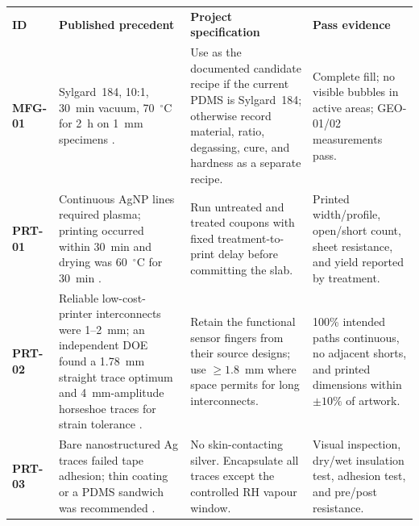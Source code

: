 \vspace{0.3em}
\begingroup
\fontsize{8.0}{9.35}\selectfont
\setlength{\tabcolsep}{3pt}\renewcommand{\arraystretch}{1.07}
\begin{tabularx}{\linewidth}{>{\raggedright\arraybackslash\bfseries\color{AUBRed}}p{1.2cm}Y Y Y}
\color{white}\textbf{ID} & \color{white}\textbf{Published precedent} &
\color{white}\textbf{Project specification} & \color{white}\textbf{Pass evidence} \\
MFG-01 & Sylgard~184, 10:1, 30~min vacuum, 70~$^{\circ}$C for 2~h on 1~mm
specimens \cite{q4abukhalaf2018}. & Use as the documented candidate recipe if
the current PDMS is Sylgard~184; otherwise record material, ratio, degassing,
cure, and hardness as a separate recipe. & Complete fill; no visible bubbles in
active areas; GEO-01/02 measurements pass. \\
PRT-01 & Continuous AgNP lines required plasma; printing occurred within
30~min and drying was 60~$^{\circ}$C for 30~min
\cite{albrecht2018stretch}. & Run untreated and treated coupons with fixed
treatment-to-print delay before committing the slab. & Printed width/profile,
open/short count, sheet resistance, and yield reported by treatment. \\
PRT-02 & Reliable low-cost-printer interconnects were 1--2~mm; an independent
DOE found a 1.78~mm straight trace optimum and 4~mm-amplitude horseshoe traces
for strain tolerance \cite{albrecht2018stretch,q4abukhalaf2019}. & Retain the
functional sensor fingers from their source designs; use $\geq1.8$~mm where
space permits for long interconnects. & 100\% intended paths continuous, no
adjacent shorts, and printed dimensions within $\pm10\%$ of artwork. \\
PRT-03 & Bare nanostructured Ag traces failed tape adhesion; thin coating or a
PDMS sandwich was recommended \cite{albrecht2018stretch}. & No skin-contacting
silver. Encapsulate all traces except the controlled RH vapour window. & Visual
inspection, dry/wet insulation test, adhesion test, and pre/post resistance. \\
\end{tabularx}
\endgroup
{}



